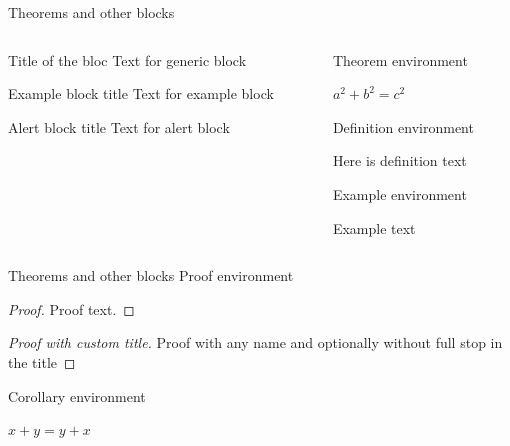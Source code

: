 \documentclass[11pt,t,aspectratio=1610,nonav]{beamer}
\begin{document}
\begin{frame}{Theorems and other blocks}
	\begin{columns}[t]
		\begin{column}{.5\textwidth}
			\begin{block}{Title of the bloc}
			Text for generic block
			\end{block}

			\vspace{11pt}
			\begin{exampleblock}{Example block title}
			Text for example block
			\end{exampleblock}

			\vspace{11pt}
			\begin{alertblock}{Alert block title}
			Text for alert block
			\end{alertblock}
		\end{column}
		\begin{column}{.5\textwidth}
			Theorem environment
			\begin{theorem}
				$a^2 + b^2 = c^2$
			\end{theorem}

			\vspace{11pt}
			Definition environment
			\begin{definition}
				Here is definition text
			\end{definition}

			\vspace{11pt}	
			Example environment
			\begin{example}
				Example text
			\end{example}
		\end{column}
	\end{columns}	
\end{frame}


\begin{frame}{Theorems and other blocks}
Proof environment
	\begin{proof}
	Proof text.
	\end{proof}
	
	\begin{proof}[Proof with custom title\nopunct]
	Proof with any name and optionally without full stop in the title
	\end{proof}

\vspace{11pt}	
Corollary environment
	\begin{corollary}
	$ x + y = y + x  $
	\end{corollary}
\end{frame}
\end{document}
